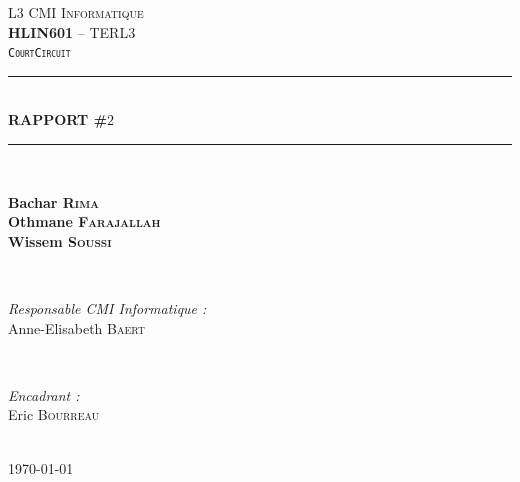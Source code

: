 \documentclass[a4paper,12pt]{report}
\newcommand{\HRule}{\rule{\linewidth}{0.5mm}}
\theoremstyle{break}
\theoremstyle{break}
\theoremstyle{break}
\theoremstyle{break}
\theoremstyle{definition}
\theoremstyle{remark}
\begin{document}
\begin{titlepage}
\textsc{\LARGE L3 CMI Informatique}\\[0.5cm]
\textsc{\Large \textbf{HLIN601} -- TERL3}\\[0.25cm]
\textsc{\Large \texttt{CourtCircuit}}\\[2cm]
\HRule \\[0.4cm]
{\huge \bfseries RAPPORT \#$2$}\\[0.1cm]
\HRule \\[2cm]
\begin{minipage}{0.5\textwidth}
\centering \large
\textbf{Bachar \textsc{Rima}}\\
\textbf{Othmane \textsc{Farajallah}}\\
\textbf{Wissem \textsc{Soussi}}
\end{minipage} \\[2cm]
\begin{minipage}[b]{0.5\textwidth}
\begin{flushleft} \large
\emph{Responsable CMI Informatique :} \\
Anne-Elisabeth \textsc{Baert} \\
\end{flushleft}
\end{minipage}
~
\begin{minipage}[b]{0.4\textwidth}
\begin{flushright} \large
\emph{Encadrant :}\\
Eric \textsc{Bourreau}
\end{flushright}
\end{minipage}\\[1.5cm]
{\large \today}\\[1cm]
\hspace{\fill}
\vfill %
\end{titlepage}
{
  \hypersetup{linkcolor=black}
  \tableofcontents
  \setcounter{page}{3}
}
\end{document}
